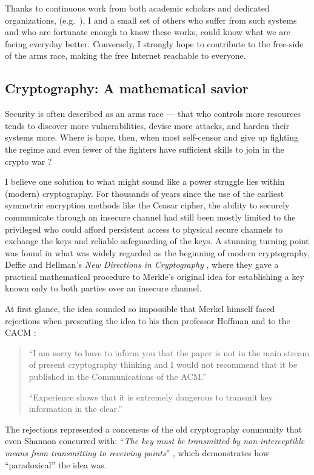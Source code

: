 \documentclass[10pt]{article}
\begin{document}
Thanks to continuous work from both academic scholars and dedicated
organizations, (e.g.\ \cite{data.analysis.1, data.analysis.2, censor.block.6}),
I and a small set of others who suffer from such systems and who are fortunate
enough to know these works, could know what we are facing everyday better.
Conversely, I strongly hope to contribute to the free-side of the arms race,
making the free Internet reachable to everyone.

\subsection[Cryptography]{Cryptography: A mathematical savior}
\label{sec.crypto}
Security is often described as an arms race --- that who controls more
resources tends to discover more vulnerabilities, devise more attacks, and
harden their systems more. Where is hope, then, when most self-censor and give
up fighting the regime \cite{self.censor.1, self.censor.2, self.censor.3}  and
even fewer of the fighters have sufficient skills to join in the crypto war
\cite{defenders.lack.skills.1, defenders.lack.skills.2}?

I believe one solution to what might sound like a power struggle lies within
(modern) cryptography. For thousands of years since the use of the earliest
symmetric encryption methods like the Ceasar cipher, the ability to securely
communicate through an insecure channel had still been mostly limited to the
privileged who could afford persistent access to physical secure channels to
exchange the keys and reliable safeguarding of the keys.  A stunning turning
point was found in what was widely regarded as the beginning of modern
cryptography, Deffie and Hellman's \emph{New Directions in Cryptography}
\cite{new.directions.crypto}, where they gave a practical mathematical
procedure to Merkle's original idea for establishing a key known only to both
parties over an insecure channel.

At first glance, the idea sounded so impossible that Merkel himself faced 
rejections when presenting the idea to his then professor Hoffman and to the
CACM \cite{merkle.rejection}:
\begin{quotation}
	``I am sorry to have to inform you that the paper is not in the main stream
	of present cryptography thinking and I would not recommend that it be
	published in the Communications of the ACM.''

	``Experience shows that it is extremely dangerous to transmit key
	information in the clear.''\cite{merkle.rejection}
\end{quotation}
The rejections represented a concensus of the old cryptography community that
even Shannon concurred with: ``\emph{The key must be transmitted by
non-interceptible means from transmitting to receiving points}''
\cite[p.~670]{shannon.theory.secrecy}, which demonstrates how ``paradoxical''
the idea was.
\end{document}
